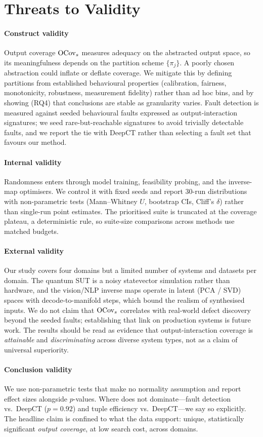\section{Threats to Validity}
\label{sec:threats}

\paragraph{Construct validity}
Output coverage $\mathrm{OCov}_s$ measures adequacy on the abstracted output space, so its
meaningfulness depends on the partition scheme $\{\pi_j\}$. A poorly chosen
abstraction could inflate or deflate coverage. We mitigate this by defining
partitions from established behavioural properties (calibration, fairness,
monotonicity, robustness, measurement fidelity) rather than ad hoc bins, and by
showing (RQ4) that conclusions are stable as granularity varies. Fault detection
is measured against seeded behavioural faults expressed as output-interaction
signatures; we seed rare-but-reachable signatures to avoid trivially detectable
faults, and we report the tie with DeepCT rather than selecting a fault set that
favours our method.

\paragraph{Internal validity}
Randomness enters through model training, feasibility probing, and the inverse-map
optimisers. We control it with fixed seeds and report 30-run distributions with
non-parametric tests (Mann--Whitney $U$, bootstrap CIs, Cliff's $\delta$) rather
than single-run point estimates. The prioritised suite is truncated at the
coverage plateau, a deterministic rule, so suite-size comparisons across methods
use matched budgets.

\paragraph{External validity}
Our study covers four domains but a limited number of systems and datasets per
domain. The quantum SUT is a noisy statevector simulation rather than hardware,
and the vision/NLP inverse maps operate in latent (PCA / SVD) spaces with
decode-to-manifold steps, which bound the realism of synthesised inputs. We do not
claim that $\mathrm{OCov}_s$ correlates with real-world defect discovery beyond the seeded
faults; establishing that link on production systems is future work. The results
should be read as evidence that output-interaction coverage is \emph{attainable}
and \emph{discriminating} across diverse system types, not as a claim of universal
superiority.

\paragraph{Conclusion validity}
We use non-parametric tests that make no normality assumption and report effect
sizes alongside $p$-values. Where \rnwise{} does not dominate---fault detection
vs.\ DeepCT ($p=0.92$) and tuple efficiency vs.\ DeepCT---we say so explicitly.
The headline claim is confined to what the data support: unique, statistically
significant \emph{output coverage}, at low search cost, across domains.
